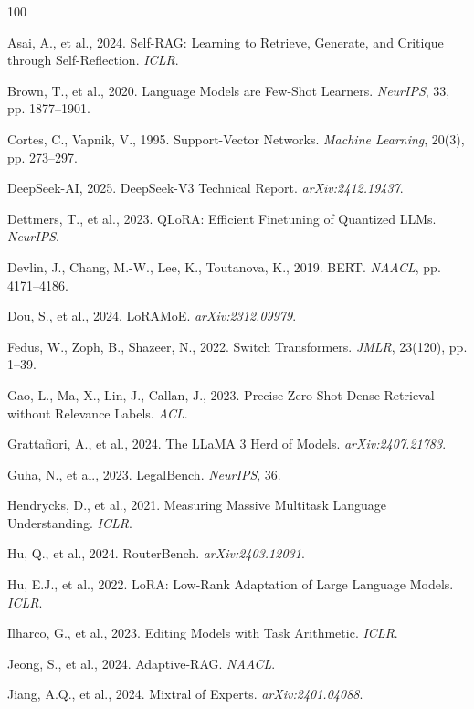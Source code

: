 \documentclass[a4paper,fleql]{cas-sc}
\begin{document}
\begin{thebibliography}{100}

Asai, A., et al., 2024. Self-RAG: Learning to Retrieve, Generate, and Critique through Self-Reflection. \textit{ICLR}.

Brown, T., et al., 2020. Language Models are Few-Shot Learners. \textit{NeurIPS}, 33, pp. 1877--1901.

Cortes, C., Vapnik, V., 1995. Support-Vector Networks. \textit{Machine Learning}, 20(3), pp. 273--297.

DeepSeek-AI, 2025. DeepSeek-V3 Technical Report. \textit{arXiv:2412.19437}.

Dettmers, T., et al., 2023. QLoRA: Efficient Finetuning of Quantized LLMs. \textit{NeurIPS}.

Devlin, J., Chang, M.-W., Lee, K., Toutanova, K., 2019. BERT. \textit{NAACL}, pp. 4171--4186.

Dou, S., et al., 2024. LoRAMoE. \textit{arXiv:2312.09979}.

Fedus, W., Zoph, B., Shazeer, N., 2022. Switch Transformers. \textit{JMLR}, 23(120), pp. 1--39.

Gao, L., Ma, X., Lin, J., Callan, J., 2023. Precise Zero-Shot Dense Retrieval without Relevance Labels. \textit{ACL}.

Grattafiori, A., et al., 2024. The LLaMA 3 Herd of Models. \textit{arXiv:2407.21783}.

Guha, N., et al., 2023. LegalBench. \textit{NeurIPS}, 36.

Hendrycks, D., et al., 2021. Measuring Massive Multitask Language Understanding. \textit{ICLR}.

Hu, Q., et al., 2024. RouterBench. \textit{arXiv:2403.12031}.

Hu, E.J., et al., 2022. LoRA: Low-Rank Adaptation of Large Language Models. \textit{ICLR}.

Ilharco, G., et al., 2023. Editing Models with Task Arithmetic. \textit{ICLR}.

Jeong, S., et al., 2024. Adaptive-RAG. \textit{NAACL}.

Jiang, A.Q., et al., 2024. Mixtral of Experts. \textit{arXiv:2401.04088}.


\end{thebibliography}
\end{document}
